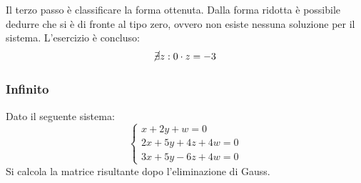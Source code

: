\documentclass[a4paper]{article}
\begin{document}
	\noindent
	Il \textcolor{Red3}{terzo passo} è classificare la forma ottenuta. Dalla forma ridotta è possibile dedurre che si è di fronte al tipo zero, ovvero non esiste nessuna soluzione per il sistema. L'esercizio è concluso:
	\begin{equation*}
		\cancel{\exists} z : 0 \cdot z = -3
	\end{equation*}\newpage

	\subsubsection{Infinito}
	
	Dato il seguente sistema:
	\begin{equation*}
		\begin{cases}
			x + 2y + w = 0 	\\
			2x + 5y + 4z + 4w = 0 \\
			3x + 5y - 6z + 4w = 0
		\end{cases}
	\end{equation*}
	Si calcola la matrice risultante dopo l'eliminazione di Gauss.\newline
	
\end{document}
